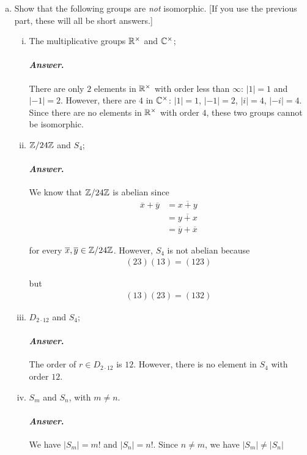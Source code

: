\documentclass[11pt, reqno]{amsart}
\theoremstyle{plain}
\theoremstyle{definition}
\theoremstyle{example}
\newenvironment{ans}{\color{black}\medskip \paragraph*{\emph{Answer}.}}{\hfill \break  $~\!\!$ \dotfill \medskip }
\begin{document}
\begin{enumerate}[1.]
\begin{enumerate}[(a)]
\begin{enumerate}[(i)]
\begin{proof}
In addition, from what we have proved above, we have $g^n = 1 \implies \varphi(g)^n = 1$. Since we showed that neither $g^k$ nor $\varphi^k$ are $1$ for any $k \in \{1, \cdots, n-1\}$, we have that $|g| = |\varphi(g)| = n$
\end{proof}
\end{enumerate}
\item Show that the following groups are \emph{not} isomorphic. [If you use the previous part, these will all be short answers.]
\begin{enumerate}[(i)]
\item The multiplicative groups $\mathbb{R}^\times$ and $\mathbb{C}^\times$;
\begin{ans}
There are only $2$ elements in $\mathbb{R}^\times$ with order less than $\infty$: $|1| = 1$ and $|-1| = 2$. However, there are $4$ in $\mathbb{C}^\times$: $|1| = 1$, $|-1| = 2$, $|i| = 4$, $|-i| = 4$.\\

Since there are no elements in $\mathbb{R}^\times$ with order $4$, these two groups cannot be isomorphic.
\end{ans}
\item $\mathbb{Z}/24\mathbb{Z}$ and $S_4$;
\begin{ans}
We know that $\mathbb{Z}/24\mathbb{Z}$ is abelian since
\begin{align*}
\overline{x} + \overline{y} &= \overline{x + y}\\
&= \overline{y + x}\\
&= \overline{y} + \overline{x}
\end{align*}

for every $\overline{x}, \overline{y} \in \mathbb{Z}/24\mathbb{Z}$. However, $S_4$ is not abelian because
\begin{align*}
(2 3)(1 3) = (1 2 3)
\end{align*}

but
\begin{align*}
(1 3)(2 3) = (1 3 2)
\end{align*}
\end{ans}

\item $D_{2\cdot12}$ and $S_4$;
\begin{ans}
The order of $r \in D_{2 \cdot 12}$ is $12$. However, there is no element in $S_4$ with order $12$.
\end{ans}

\item $S_m$ and $S_n$, with $m \neq n$.
\begin{ans}
We have $|S_m| = m!$ and $|S_n| = n!$. Since $n \neq m$, we have $|S_m| \neq |S_n|$
\end{ans}
\end{enumerate}


\end{enumerate}
\end{enumerate}
\end{document}
